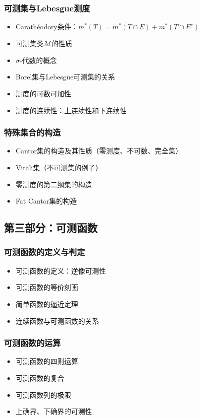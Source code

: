 \subsubsection{可测集与Lebesgue测度}
\begin{itemize}
    \item Carathéodory条件：$m^*(T) = m^*(T \cap E) + m^*(T \cap E^c)$
    \item 可测集类$\mathcal{M}$的性质
    \item $\sigma$-代数的概念
    \item Borel集与Lebesgue可测集的关系
    \item 测度的可数可加性
    \item 测度的连续性：上连续性和下连续性
\end{itemize}

\subsubsection{特殊集合的构造}
\begin{itemize}
    \item Cantor集的构造及其性质（零测度、不可数、完全集）
    \item Vitali集（不可测集的例子）
    \item 零测度的第二纲集的构造
    \item Fat Cantor集的构造
\end{itemize}

\subsection{第三部分：可测函数}

\subsubsection{可测函数的定义与判定}
\begin{itemize}
    \item 可测函数的定义：逆像可测性
    \item 可测函数的等价刻画
    \item 简单函数的逼近定理
    \item 连续函数与可测函数的关系
\end{itemize}

\subsubsection{可测函数的运算}
\begin{itemize}
    \item 可测函数的四则运算
    \item 可测函数的复合
    \item 可测函数列的极限
    \item 上确界、下确界的可测性
\end{itemize}

